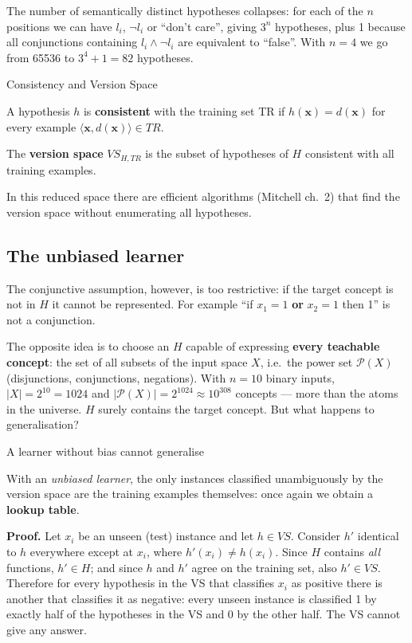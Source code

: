 The number of semantically distinct hypotheses collapses: for each of
the \(n\) positions we can have \(l_i\), \(\neg l_i\) or ``don't
care'', giving \(3^n\) hypotheses, plus 1 because all conjunctions
containing \(l_i \wedge \neg l_i\) are equivalent to ``false''. With
\(n = 4\) we go from 65536 to \(3^4 + 1 = 82\) hypotheses.

\begin{boxdefinition}{Consistency and Version Space}

A hypothesis \(h\) is \textbf{consistent} with the training set TR if
\(h(\mathbf{x}) = d(\mathbf{x})\) for every example
\(\langle \mathbf{x}, d(\mathbf{x})\rangle \in TR\).

The \textbf{version space} \(VS_{H,TR}\) is the subset of hypotheses of
\(H\) consistent with all training examples.

\end{boxdefinition}

In this reduced space there are efficient algorithms (Mitchell ch.\ 2)
that find the version space without enumerating all hypotheses.

\subsection{The unbiased learner}\label{lunbiased-learner}

The conjunctive assumption, however, is too restrictive: if the target
concept is not in \(H\) it cannot be represented. For example ``if
\(x_1 = 1\) \textbf{or} \(x_2 = 1\) then 1'' is not a conjunction.

The opposite idea is to choose an \(H\) capable of expressing
\textbf{every teachable concept}: the set of all subsets of the input
space \(X\), i.e.\ the power set \(\mathcal{P}(X)\) (disjunctions,
conjunctions, negations). With \(n = 10\) binary inputs,
\(|X| = 2^{10} = 1024\) and
\(|\mathcal{P}(X)| = 2^{1024} \approx 10^{308}\) concepts --- more than
the atoms in the universe. \(H\) surely contains the target concept.
But what happens to generalisation?

\begin{boxtheorem}{A learner without bias cannot generalise}

With an \emph{unbiased learner}, the only instances classified
unambiguously by the version space are the training examples
themselves: once again we obtain a \textbf{lookup table}.

\textbf{Proof.} Let \(x_i\) be an unseen (test) instance and let
\(h \in VS\). Consider \(h'\) identical to \(h\) everywhere except at
\(x_i\), where \(h'(x_i) \ne h(x_i)\). Since \(H\) contains \emph{all}
functions, \(h' \in H\); and since \(h\) and \(h'\) agree on the
training set, also \(h' \in VS\). Therefore for every hypothesis in the
VS that classifies \(x_i\) as positive there is another that classifies
it as negative: every unseen instance is classified 1 by exactly half
of the hypotheses in the VS and 0 by the other half. The VS cannot give
any answer.

\end{boxtheorem}

